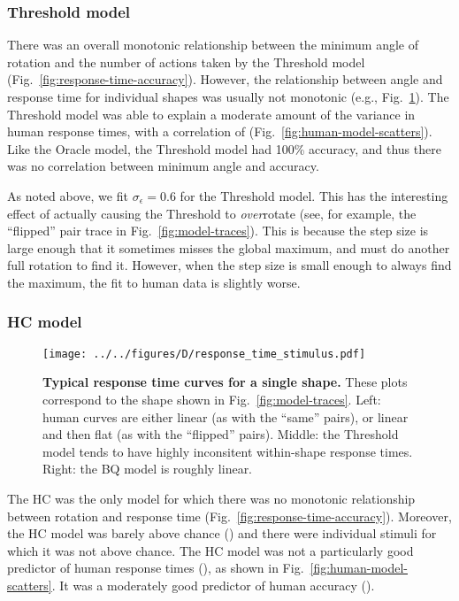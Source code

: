 \documentclass[10pt,letterpaper]{article}
\newcommand{\Oc}[0]{Oracle}
\newcommand{\Th}[0]{Threshold}
\newcommand{\Hc}[0]{HC}
\newcommand{\Bq}[0]{BQ}
\begin{document}
\subsubsection{\Th{} model}

There was an overall monotonic relationship between the minimum angle
of rotation and the number of actions taken by the \Th{} model
(Fig.~\ref{fig:response-time-accuracy}). However, the relationship
between angle and response time for individual shapes was usually not
monotonic (e.g., Fig.~\ref{fig:response-time-stimulus}).  The \Th{}
model was able to explain a moderate amount of the variance in human
response times, with a correlation of \ThTimeCorr{}
(Fig.~\ref{fig:human-model-scatters}). Like the \Oc{} model, the \Th{}
model had 100\% accuracy, and thus there was no correlation between
minimum angle and accuracy.

As noted above, we fit $\sigma_\epsilon=0.6$ for the \Th{} model. This
has the interesting effect of actually causing the \Th{} to
\textit{over}rotate (see, for example, the ``flipped'' pair trace in
Fig.~\ref{fig:model-traces}). This is because the step size is large
enough that it sometimes misses the global maximum, and must do
another full rotation to find it. However, when the step size is small
enough to always find the maximum, the fit to human data is slightly
worse.

\subsubsection{\Hc{} model}

\begin{figure}[t]
  \begin{center}
    \texttt{[image: ../../figures/D/response\_time\_stimulus.pdf]}
    \caption{\textbf{Typical response time curves for a single shape.}
      These plots correspond to the shape shown in
      Fig.~\ref{fig:model-traces}. Left: human curves are either
      linear (as with the ``same'' pairs), or linear and then flat (as
      with the ``flipped'' pairs). Middle: the \Th{} model tends to
      have highly inconsitent within-shape response times. Right: the
      \Bq{} model is roughly linear.}
    \label{fig:response-time-stimulus}
  \end{center}
\end{figure}

The \Hc{} was the only model for which there was no monotonic
relationship between rotation and response time
(Fig.~\ref{fig:response-time-accuracy}). Moreover, the \Hc{} model was
barely above chance (\HcAccuracy{}) and there were \HcNumChance{}
individual stimuli for which it was not above chance. The \Hc{} model
was not a particularly good predictor of human response times
(\HcTimeCorr{}), as shown in Fig.~\ref{fig:human-model-scatters}. It
was a moderately good predictor of human accuracy (\HcAccuracyCorr{}).
\end{document}
